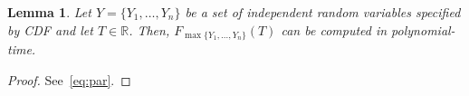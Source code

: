 \documentclass[review]{elsarticle}
\newcommand\diag[4]{%
  \multicolumn{1}{p{#2}|}{\hskip-\tabcolsep
  $\vcenter{\begin{tikzpicture}[baseline=0,anchor=south west,inner sep=#1]
  \path[use as bounding box] (0,0) rectangle (#2+2\tabcolsep,\baselineskip);
  \node[minimum width={#2+2\tabcolsep},minimum height=\baselineskip+\extrarowheight] (box) {};
  \draw (box.north west) -- (box.south east);
  \node[anchor=south west] at (box.south west) {#3};
  \node[anchor=north east] at (box.north east) {#4};
 \end{tikzpicture}}$\hskip-\tabcolsep}}
\newtheorem{lemma}{Lemma}
\begin{document}
\begin{lemma} \label{TPar}
	Let $Y=\{Y_1,\dots,Y_n\}$ be a set of independent random variables specified by
	CDF  and let $T \in \mathbb{R}$. Then,  $F_{\max\{Y_1,\dots,Y_n\}}(T)$
	can be computed in polynomial-time.
\end{lemma}
\begin{proof}
	See~\eqref{eq:par}.
\end{proof}

%
%
%
%			
%		
%
\end{document}
